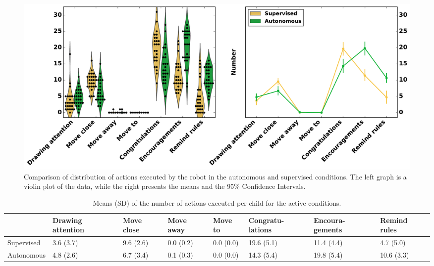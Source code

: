 \begin{figure}[ht]
	\includegraphics[width=1\linewidth]{actions.pdf}
	\centering
	\caption{Comparison of distribution of actions executed by the robot in the autonomous and supervised conditions. The left graph is a violin plot of the data, while the right presents the means and the 95\% Confidence Intervals.}
	\label{fig:tutoring_actions_distribution}
\end{figure}

\begin{table}[ht]
	\centering
	\caption{Means (SD) of the number of actions executed per child for the active conditions.}
	\label{tab:tuto_results_actions}
	\begin{tabularx}{\textwidth}{@{}L{1.3}L{1.1}L{.7}L{.7}L{.7}L{1.}L{1}L{.8}@{}}\toprule
 & Drawing attention & Move close & Move away & Move to & Congratu-lations & Encoura-gements & Remind rules\\ 
\midrule 
Supervised & 3.6 \hspace{.5cm} (3.7) & 9.6 (2.6) & 0.0 (0.2) & 0.0 (0.0) & 19.6 (5.1) & 11.4 (4.4) & 4.7 (5.0)\\ 
Autonomous & 4.8 \hspace{.5cm}(2.6) & 6.7 (3.4) & 0.1 (0.3) & 0.0 (0.0) & 14.3 (5.4) & 19.8 (5.4) & 10.6 (3.3)\\ 

		\bottomrule
	\end{tabularx}
\end{table}

